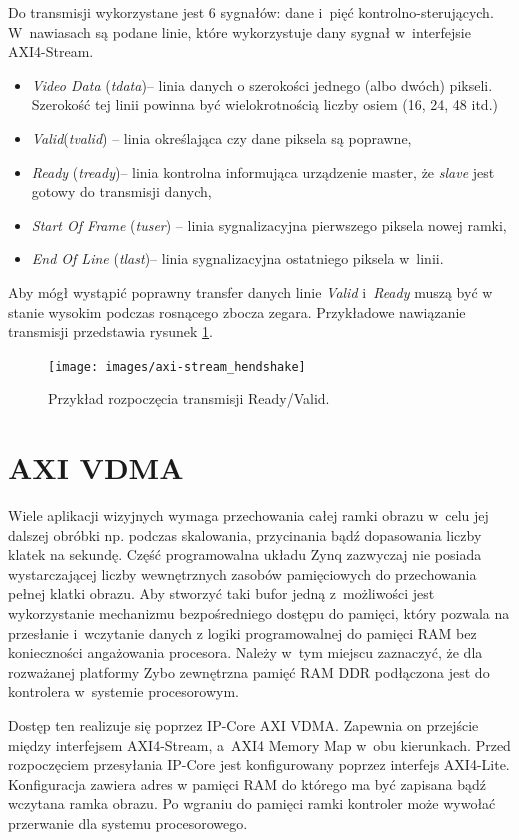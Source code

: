 Do transmisji wykorzystane jest 6 sygnałów: dane i~pięć kontrolno-sterujących. 
W~nawiasach są podane linie, które wykorzystuje dany sygnał w~interfejsie AXI4-Stream.
\begin{itemize}
\item \textit{Video Data} (\textit{tdata})-- linia danych o szerokości jednego (albo dwóch) pikseli. Szerokość tej linii powinna być wielokrotnością liczby osiem (16, 24, 48 itd.)
\item \textit{Valid}(\textit{tvalid}) -- linia określająca czy dane piksela są poprawne,
\item \textit{Ready} (\textit{tready})-- linia kontrolna informująca urządzenie master, że \textit{slave} jest gotowy do transmisji danych, 
\item \textit{Start Of Frame} (\textit{tuser}) -- linia sygnalizacyjna pierwszego piksela nowej ramki,
\item \textit{End Of Line} (\textit{tlast})-- linia sygnalizacyjna ostatniego piksela w~linii. 
\end{itemize}

Aby mógł wystąpić poprawny transfer danych linie \textit{Valid} i~\textit{Ready} muszą być w stanie wysokim podczas rosnącego zbocza zegara.
Przykładowe nawiązanie transmisji przedstawia rysunek \ref{fig:handshake}.

\begin{figure}[h]
\centering
\texttt{[image: images/axi-stream\_hendshake]}
\caption{Przykład rozpoczęcia transmisji Ready/Valid.}
\label{fig:handshake}
\end{figure}


\section{AXI VDMA}
Wiele aplikacji wizyjnych wymaga przechowania całej ramki obrazu w~celu jej dalszej obróbki np. podczas skalowania, przycinania bądź dopasowania liczby klatek na sekundę.
Część programowalna układu Zynq zazwyczaj nie posiada wystarczającej liczby wewnętrznych zasobów pamięciowych do przechowania pełnej klatki obrazu.
Aby stworzyć taki bufor jedną z~możliwości jest wykorzystanie mechanizmu bezpośredniego dostępu do pamięci, który pozwala na przesłanie i~wczytanie danych z logiki programowalnej do pamięci RAM bez konieczności angażowania procesora.
Należy w~tym miejscu zaznaczyć, że dla rozważanej platformy Zybo zewnętrzna pamięć RAM DDR podłączona jest do kontrolera w~systemie procesorowym.

Dostęp ten realizuje się poprzez IP-Core AXI VDMA.
Zapewnia on przejście między interfejsem AXI4-Stream, a~AXI4 Memory Map w~obu kierunkach.
Przed rozpoczęciem przesyłania IP-Core jest konfigurowany poprzez interfejs AXI4-Lite.
Konfiguracja zawiera adres w pamięci RAM do którego ma być zapisana bądź wczytana ramka obrazu.
Po wgraniu do pamięci ramki kontroler może wywołać przerwanie dla systemu procesorowego.

